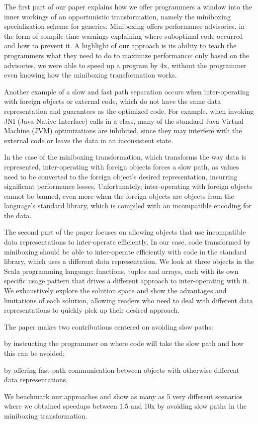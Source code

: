 The first part of our paper explains how we offer programmers a window into the inner workings of an opportunistic transformation, namely the miniboxing specialization scheme for generics. Miniboxing offers performance advisories, in the form of compile-time warnings explaining where suboptimal code occurred and how to prevent it. A highlight of our approach is its ability to teach the programmers what they need to do to maximize performance: only based on the advisories, we were able to speed up a program by 4x, without the programmer even knowing how the miniboxing transformation works.

Another example of a slow and fast path separation occurs when inter-operating with foreign objects or external code, which do not have the same data representation and guarantees as the optimized code. For example, when invoking JNI (Java Native Interface) calls in a class, many of the standard Java Virtual Machine (JVM) optimizations are inhibited, since they may interfere with the external code or leave the data in an inconsistent state.

In the case of the miniboxing transformation, which transforms the way data is represented, inter-operating with foreign objects forces a slow path, as values need to be converted to the foreign object's desired representation, incurring significant performance losses. Unfortunately, inter-operating with foreign objects cannot be banned, even more when the foreign objects are objects from the language's standard library, which is compiled with an incompatible encoding for the data.

The second part of the paper focuses on allowing objects that use incompatible data representations to inter-operate efficiently. In our case, code transformed by miniboxing should be able to inter-operate efficiently with code in the standard library, which uses a different data representation. We look at three objects in the Scala programming language: functions, tuples and arrays, each with its own specific usage pattern that drives a different approach to inter-operating with it. We exhaustively explore the solution space and show the advantages and limitations of each solution, allowing readers who need to deal with different data representations to quickly pick up their desired approach.

The paper makes two contributions centered on avoiding slow paths:
\begin{compactitem}
  \item by instructing the programmer on where code will take the slow path and how this can be avoided;
  \item by offering fast-path communication between objects with otherwise different data representations.
\end{compactitem}

We benchmark our approaches and show as many as 5 very different scenarios where we obtained speedups between 1.5 and 10x by avoiding slow paths in the miniboxing transformation.
